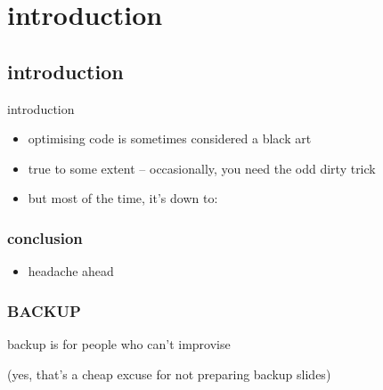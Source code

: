 \maketitle

\section{introduction}
\subsection{introduction}
\begin{frame}{introduction}
\begin{itemize}
\item optimising code is sometimes considered a black art
\item true to some extent -- occasionally, you need the odd dirty trick
\item but most of the time, it's down to:
\end{itemize}
\end{frame}
\begin{frame}
  \frametitle{conclusion}
  
  \begin{itemize}
      \item headache ahead
  \end{itemize}

  \vspace{.3\textheight}

\end{frame}

\appendix

\begin{frame}
  \frametitle{BACKUP}
  backup is for people who can't improvise

  (yes, that's a cheap excuse for not preparing backup slides)
\end{frame}
